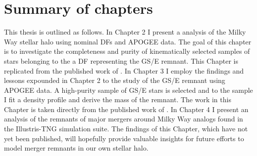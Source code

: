 \section{Summary of chapters}

This thesis is outlined as follows. In Chapter 2 I present a analysis of the Milky Way stellar halo using nominal DFs and APOGEE data. The goal of this chapter is to investigate the completeness and purity of kinematically selected samples of stars belonging to the a DF representing the GS/E remnant. This Chapter is replicated from the published work of \textcite{lane22}. In Chapter 3 I employ the findings and lessons expounded in Chapter 2 to the study of the GS/E remnant using APOGEE data. A high-purity sample of GS/E stars is selected and to the sample I fit a density profile and derive the mass of the remnant. The work in this Chapter is taken directly from the published work of \textcite{lane23}. In Chapter 4 I present an analysis of the remnants of major mergers around Milky Way analogs found in the Illustris-TNG simulation suite. The findings of this Chapter, which have not yet been published, will hopefully provide valuable insights for future efforts to model merger remnants in our own stellar halo.
